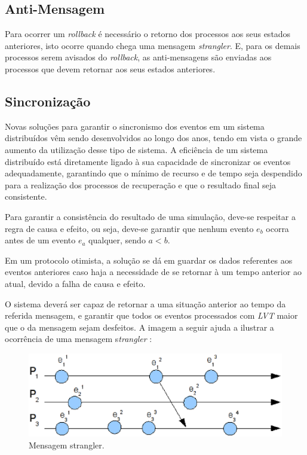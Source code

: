 \subsection{Anti-Mensagem}%
Para ocorrer um \textit{rollback} é necessário o retorno dos processos aos seus estados anteriores, isto ocorre quando chega uma mensagem \textit{strangler}. E, para os demais processos serem avisados do \textit{rollback}, as anti-mensagens são enviadas aos processos que devem retornar aos seus estados anteriores.

\subsection{Sincronização}
Novas soluções para garantir o sincronismo dos eventos em um sistema distribuídos vêm sendo desenvolvidos ao longo dos anos, tendo em vista o grande aumento da utilização desse tipo de sistema. A eficiência de um sistema distribuído está diretamente ligado à sua capacidade de sincronizar os eventos adequadamente, garantindo que o mínimo de recurso e de tempo seja despendido para a realização dos processos de recuperação e que o resultado final seja consistente.

	Para garantir a consistência do resultado de uma simulação, deve-se respeitar a regra de causa e efeito, ou seja, deve-se garantir que nenhum evento $e_b$ ocorra antes de um evento $e_a$ qualquer, sendo $a<b$.
	
	Em um protocolo otimista, a solução se dá em guardar os dados referentes aos eventos anteriores caso haja a necessidade de se retornar à um tempo anterior ao atual, devido a falha de causa e efeito. 
	
	O sistema deverá ser capaz de retornar a uma situação anterior ao tempo da referida mensagem, e garantir que todos os eventos processados com \textit{LVT} maior que o da mensagem sejam desfeitos. A imagem a seguir ajuda a ilustrar a ocorrência de uma mensagem s\textit{trangler} :

\begin{figure}
  \centerline{\includegraphics[scale=0.6]{strangler.eps}}
  \caption{Mensagem strangler.}
\label{fig:strangler}
\end{figure}


